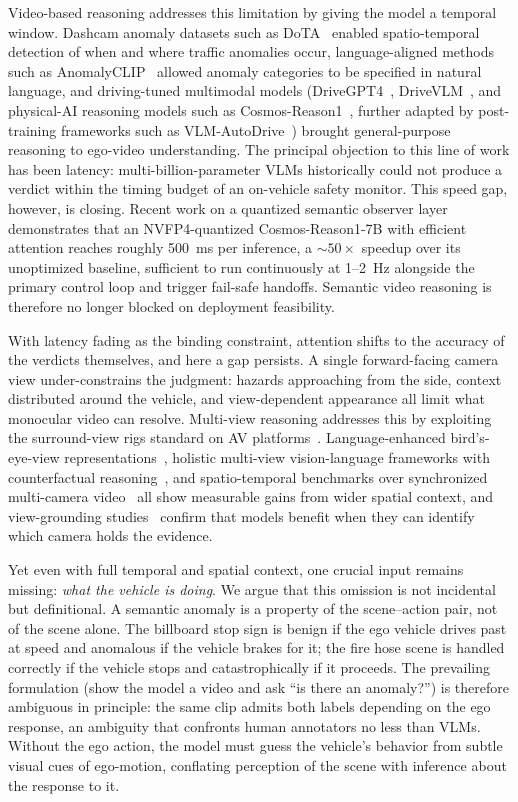 \documentclass[conference]{IEEEtran}
\begin{document}
Video-based reasoning addresses this limitation by giving the model a temporal window. Dashcam anomaly datasets such as DoTA~\cite{b7} enabled spatio-temporal detection of when and where traffic anomalies occur, language-aligned methods such as AnomalyCLIP~\cite{b8} allowed anomaly categories to be specified in natural language, and driving-tuned multimodal models (DriveGPT4~\cite{b9}, DriveVLM~\cite{b10}, and physical-AI reasoning models such as Cosmos-Reason1~\cite{b11}, further adapted by post-training frameworks such as VLM-AutoDrive~\cite{b12}) brought general-purpose reasoning to ego-video understanding. The principal objection to this line of work has been latency: multi-billion-parameter VLMs historically could not produce a verdict within the timing budget of an on-vehicle safety monitor. This speed gap, however, is closing. Recent work on a quantized semantic observer layer~\cite{b13} demonstrates that an NVFP4-quantized Cosmos-Reason1-7B with efficient attention reaches roughly 500~ms per inference, a ${\sim}50\times$ speedup over its unoptimized baseline, sufficient to run continuously at 1--2~Hz alongside the primary control loop and trigger fail-safe handoffs. Semantic video reasoning is therefore no longer blocked on deployment feasibility.

With latency fading as the binding constraint, attention shifts to the accuracy of the verdicts themselves, and here a gap persists. A single forward-facing camera view under-constrains the judgment: hazards approaching from the side, context distributed around the vehicle, and view-dependent appearance all limit what monocular video can resolve. Multi-view reasoning addresses this by exploiting the surround-view rigs standard on AV platforms~\cite{b14}. Language-enhanced bird's-eye-view representations~\cite{b15}, holistic multi-view vision-language frameworks with counterfactual reasoning~\cite{b16}, and spatio-temporal benchmarks over synchronized multi-camera video~\cite{b17} all show measurable gains from wider spatial context, and view-grounding studies~\cite{b18} confirm that models benefit when they can identify which camera holds the evidence.

Yet even with full temporal and spatial context, one crucial input remains missing: \emph{what the vehicle is doing}. We argue that this omission is not incidental but definitional. A semantic anomaly is a property of the scene--action pair, not of the scene alone. The billboard stop sign is benign if the ego vehicle drives past at speed and anomalous if the vehicle brakes for it; the fire hose scene is handled correctly if the vehicle stops and catastrophically if it proceeds. The prevailing formulation (show the model a video and ask ``is there an anomaly?'') is therefore ambiguous in principle: the same clip admits both labels depending on the ego response, an ambiguity that confronts human annotators no less than VLMs. Without the ego action, the model must guess the vehicle's behavior from subtle visual cues of ego-motion, conflating perception of the scene with inference about the response to it.
\end{document}
